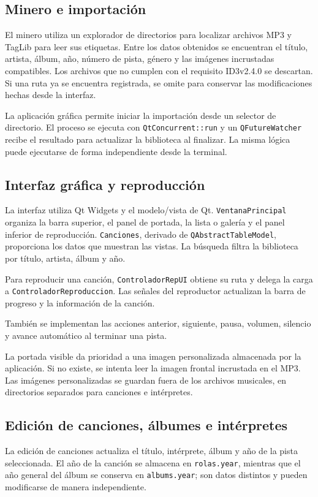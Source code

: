 \documentclass[10pt,a4paper]{article}
\begin{document}
\subsection{Minero e importación}
El minero utiliza un explorador de directorios para localizar archivos MP3 y TagLib para leer sus etiquetas. Entre los datos obtenidos se encuentran el título, artista, álbum, año, número de pista, género y las imágenes incrustadas compatibles. Los archivos que no cumplen con el requisito ID3v2.4.0 se descartan. Si una ruta ya se encuentra registrada, se omite para conservar las modificaciones hechas desde la interfaz.

La aplicación gráfica permite iniciar la importación desde un selector de directorio. El proceso se ejecuta con \texttt{QtConcurrent::run} y un \texttt{QFutureWatcher} recibe el resultado para actualizar la biblioteca al finalizar. La misma lógica puede ejecutarse de forma independiente desde la terminal.

\subsection{Interfaz gráfica y reproducción}
La interfaz utiliza Qt Widgets y el modelo/vista de Qt. \texttt{VentanaPrincipal} organiza la barra superior, el panel de portada, la lista o galería y el panel inferior de reproducción. \texttt{Canciones}, derivado de \texttt{QAbstractTableModel}, proporciona los datos que muestran las vistas. La búsqueda filtra la biblioteca por título, artista, álbum y año.

Para reproducir una canción, \texttt{Controlador\allowbreak{}RepUI} obtiene su ruta y delega la carga a \texttt{Controlador\allowbreak{}Reproduccion}. Las señales del reproductor actualizan la barra de progreso y la información de la canción.

También se implementan las acciones anterior, siguiente, pausa, volumen, silencio y avance automático al terminar una pista.

La portada visible da prioridad a una imagen personalizada almacenada por la aplicación. Si no existe, se intenta leer la imagen frontal incrustada en el MP3. Las imágenes personalizadas se guardan fuera de los archivos musicales, en directorios separados para canciones e intérpretes.

\subsection{Edición de canciones, álbumes e intérpretes}
La edición de canciones actualiza el título, intérprete, álbum y año de la pista seleccionada. El año de la canción se almacena en \texttt{rolas.year}, mientras que el año general del álbum se conserva en \texttt{albums.year}; son datos distintos y pueden modificarse de manera independiente.
\end{document}
